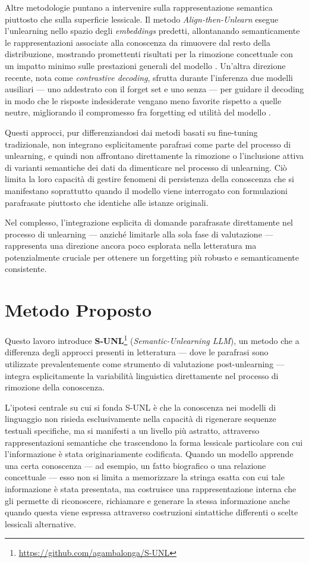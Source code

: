 Altre metodologie puntano a intervenire sulla rappresentazione semantica piuttosto che sulla superficie lessicale. Il metodo \emph{Align-then-Unlearn} esegue l’unlearning nello spazio degli \emph{embeddings} predetti, allontanando semanticamente le rappresentazioni associate alla conoscenza da rimuovere dal resto della distribuzione, mostrando promettenti risultati per la rimozione concettuale con un impatto minimo sulle prestazioni generali del modello \cite{spohn_align-then-unlearn_2025}. Un’altra direzione recente, nota come \emph{contrastive decoding}, sfrutta durante l’inferenza due modelli ausiliari — uno addestrato con il forget set e uno senza — per guidare il decoding in modo che le risposte indesiderate vengano meno favorite rispetto a quelle neutre, migliorando il compromesso fra forgetting ed utilità del modello \cite{suriyakumar_ucd_2025}.  

Questi approcci, pur differenziandosi dai metodi basati su fine-tuning tradizionale, non integrano esplicitamente parafrasi come parte del processo di unlearning, e quindi non affrontano direttamente la rimozione o l’inclusione attiva di varianti semantiche dei dati da dimenticare nel processo di unlearning. Ciò limita la loro capacità di gestire fenomeni di persistenza della conoscenza che si manifestano soprattutto quando il modello viene interrogato con formulazioni parafrasate piuttosto che identiche alle istanze originali.

Nel complesso, l’integrazione esplicita di domande parafrasate direttamente nel processo di unlearning — anziché limitarle alla sola fase di valutazione — rappresenta una direzione ancora poco esplorata nella letteratura ma potenzialmente cruciale per ottenere un forgetting più robusto e semanticamente consistente.



\section{Metodo Proposto}

Questo lavoro introduce \textbf{S-UNL}\footnote{\url{https://github.com/agambalonga/S-UNL}} (\textit{Semantic-Unlearning LLM}), un metodo che a differenza degli approcci presenti in letteratura — dove le parafrasi sono utilizzate prevalentemente come strumento di valutazione post-unlearning — integra esplicitamente la variabilità linguistica direttamente nel processo di rimozione della conoscenza. 

L'ipotesi centrale su cui si fonda S-UNL è che la conoscenza nei modelli di linguaggio non risieda esclusivamente nella capacità di rigenerare sequenze testuali specifiche, ma si manifesti a un livello più astratto, attraverso rappresentazioni semantiche che trascendono la forma lessicale particolare con cui l'informazione è stata originariamente codificata. Quando un modello apprende una certa conoscenza — ad esempio, un fatto biografico o una relazione concettuale — esso non si limita a memorizzare la stringa esatta con cui tale informazione è stata presentata, ma costruisce una rappresentazione interna che gli permette di riconoscere, richiamare e generare la stessa informazione anche quando questa viene espressa attraverso costruzioni sintattiche differenti o scelte lessicali alternative.

